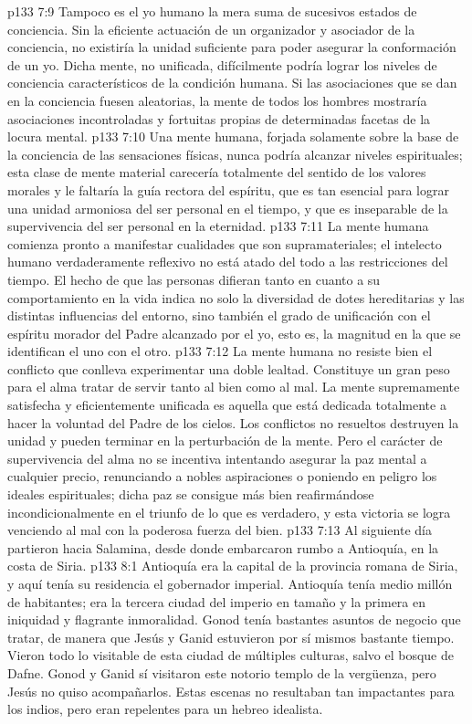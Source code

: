 \vs p133 7:9 Tampoco es el yo humano la mera suma de sucesivos estados de conciencia. Sin la eficiente actuación de un organizador y asociador de la conciencia, no existiría la unidad suficiente para poder asegurar la conformación de un yo. Dicha mente, no unificada, difícilmente podría lograr los niveles de conciencia característicos de la condición humana. Si las asociaciones que se dan en la conciencia fuesen aleatorias, la mente de todos los hombres mostraría asociaciones incontroladas y fortuitas propias de determinadas facetas de la locura mental.
\vs p133 7:10 Una mente humana, forjada solamente sobre la base de la conciencia de las sensaciones físicas, nunca podría alcanzar niveles espirituales; esta clase de mente material carecería totalmente del sentido de los valores morales y le faltaría la guía rectora del espíritu, que es tan esencial para lograr una unidad armoniosa del ser personal en el tiempo, y que es inseparable de la supervivencia del ser personal en la eternidad.
\vs p133 7:11 La mente humana comienza pronto a manifestar cualidades que son supramateriales; el intelecto humano verdaderamente reflexivo no está atado del todo a las restricciones del tiempo. El hecho de que las personas difieran tanto en cuanto a su comportamiento en la vida indica no solo la diversidad de dotes hereditarias y las distintas influencias del entorno, sino también el grado de unificación con el espíritu morador del Padre alcanzado por el yo, esto es, la magnitud en la que se identifican el uno con el otro.
\vs p133 7:12 La mente humana no resiste bien el conflicto que conlleva experimentar una doble lealtad. Constituye un gran peso para el alma tratar de servir tanto al bien como al mal. La mente supremamente satisfecha y eficientemente unificada es aquella que está dedicada totalmente a hacer la voluntad del Padre de los cielos. Los conflictos no resueltos destruyen la unidad y pueden terminar en la perturbación de la mente. Pero el carácter de supervivencia del alma no se incentiva intentando asegurar la paz mental a cualquier precio, renunciando a nobles aspiraciones o poniendo en peligro los ideales espirituales; dicha paz se consigue más bien reafirmándose incondicionalmente en el triunfo de lo que es verdadero, y esta victoria se logra venciendo al mal con la poderosa fuerza del bien.
\vs p133 7:13 \pc Al siguiente día partieron hacia Salamina, desde donde embarcaron rumbo a Antioquía, en la costa de Siria.
\vs p133 8:1 Antioquía era la capital de la provincia romana de Siria, y aquí tenía su residencia el gobernador imperial. Antioquía tenía medio millón de habitantes; era la tercera ciudad del imperio en tamaño y la primera en iniquidad y flagrante inmoralidad. Gonod tenía bastantes asuntos de negocio que tratar, de manera que Jesús y Ganid estuvieron por sí mismos bastante tiempo. Vieron todo lo visitable de esta ciudad de múltiples culturas, salvo el bosque de Dafne. Gonod y Ganid sí visitaron este notorio templo de la vergüenza, pero Jesús no quiso acompañarlos. Estas escenas no resultaban tan impactantes para los indios, pero eran repelentes para un hebreo idealista.
